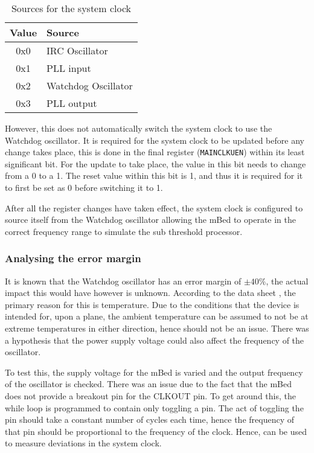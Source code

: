 \begin{table}
	\centering
	\begin{tabular}{|c|l|}
		\hline
		Value & Source \\
		\hline
		0x0 & IRC Oscillator \\
		0x1 & PLL input \\
		0x2 & Watchdog Oscillator \\
		0x3 & PLL output \\
		\hline
	\end{tabular}
	\caption{Sources for the system clock}
	\label{tab:sysclocksource}
\end{table}

However, this does not automatically switch the system clock to use the Watchdog oscillator. It is required for the system clock to be updated before any change takes place, this is done in the final register (\verb|MAINCLKUEN|) within its least significant bit. For the update to take place, the value in this bit needs to change from a 0 to a 1. The reset value within this bit is 1, and thus it is required for it to first be set as 0 before switching it to 1.

After all the register changes have taken effect, the system clock is configured to source itself from the Watchdog oscillator allowing the mBed to operate in the correct frequency range to simulate the sub threshold processor.

\subsubsection{Analysing the error margin}

It is known that the Watchdog oscillator has an error margin of $ \pm 40\%$, the actual impact this would have however is unknown. According to the data sheet \cite{mbed_not_datasheet}, the primary reason for this is temperature. Due to the conditions that the device is intended for, upon a plane, the ambient temperature can be assumed to not be at extreme temperatures in either direction, hence should not be an issue. There was a hypothesis that the power supply voltage could also affect the frequency of the oscillator. 

To test this, the supply voltage for the mBed is varied and the output frequency of the oscillator is checked. There was an issue due to the fact that the mBed does not provide a breakout pin for the CLKOUT pin. To get around this, the while loop is programmed to contain only toggling a pin. The act of toggling the pin should take a constant number of cycles each time, hence the frequency of that pin should be proportional to the frequency of the clock. Hence, can be used to measure deviations in the system clock.


